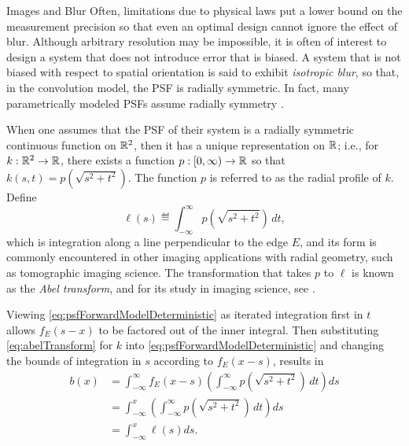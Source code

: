 \begin{chapter}{Images and Blur}
  Often, limitations due to physical laws put a lower bound on the measurement precision so that even an optimal design cannot ignore the effect of blur.
  Although arbitrary resolution may be impossible, it is often of interest to design a system that does not introduce error that is biased.
  A system that is not biased with respect to spatial orientation is said to exhibit \emph{isotropic blur}, so that, in the convolution model, the PSF is radially symmetric.
  In fact, many parametrically modeled PSFs assume radially symmetry \citep{doering1992,jain1989,kundur1996blind,watson1993}.  

  When one assumes that the PSF of their system is a radially symmetric continuous function on $\mathbb R^2$, then it has a unique representation on $\mathbb R$; i.e., for $k:\mathbb R^2 \to \mathbb R$, there exists a function $p:[0,\infty)\to \mathbb R$ so that $k(s,t) = p\left(\sqrt{s^2 + t^2}\right)$.  
  The function $p$ is referred to as the radial profile of $k$.
  Define
  \begin{equation} \label{eq:abelTransform}
    \ell(s) \eqdef \int_{-\infty}^\infty p\left(\sqrt{s^2 + t^2}\right)\,dt,
  \end{equation}
  which is integration along a line perpendicular to the edge $E$, and its form is commonly encountered in other imaging applications with radial geometry, such as tomographic imaging science.
  The transformation that takes $p$ to $\ell$ is known as the \emph{Abel transform}, and for its study in imaging science, see \citep{bracewell,epstein2008,knill93}.

  Viewing \eqref{eq:psfForwardModelDeterministic} as iterated integration first in $t$ allows $f_E(s-x)$ to be factored out of the inner integral. 
  Then substituting \eqref{eq:abelTransform} for $k$ into  \eqref{eq:psfForwardModelDeterministic} and changing the bounds of integration in $s$ according to $f_E(x-s)$, results in
  \begin{align}
    b(x) &= \int_{-\infty}^\infty f_E(x-s) \left(\int_{-\infty}^\infty p\left(\sqrt{s^2 + t^2}\right)\,dt\right)ds \nonumber \\
         &= \int_{-\infty}^x \left(\int_{-\infty}^\infty p\left(\sqrt{s^2 + t^2}\right)\,dt\right)ds \nonumber \\
         &= \int_{-\infty}^x \ell(s)ds. \label{eq:abelForward}
  \end{align}


\end{chapter}
